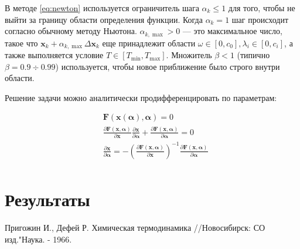﻿\documentclass[12pt]{article}
\newcommand{\pd}[2]{\frac{\partial #1}{\partial #2}}
\let\dividesymbol\div
\renewcommand{\div}{\operatorname{div}}
\renewcommand{\leq}{\leqslant}
\begin{document}
В методе \eqref{eq:newton} используется ограничитель шага $\alpha_k \leq 1$ для того, чтобы не выйти за границу области
определения функции. Когда $\alpha_k = 1$ шаг происходит согласно обычному методу Ньютона. $\alpha_{k, \max} > 0$ ---
это максимальное число, такое что $\mathbf{x}_k + \alpha_{k,\max} \Delta \mathbf{x}_{k}$ еще принадлежит области
$\omega \in [0,c_0], \lambda_i \in [0, c_i]$, а также выполняется условие $T \in [T_{\min}, T_{\max}]$. Множитель
$\beta < 1$ (типично $\beta = 0.9 \dividesymbol 0.99$) используется, чтобы новое приближение было строго внутри
области.

Решение задачи можно аналитически продифференцировать по параметрам:

\begin{equation}
\begin{aligned}
&\mathbf{F}(\mathbf{x}(\boldsymbol \alpha), \boldsymbol \alpha) = 0\\
&\pd{\mathbf{F}(\mathbf{x}, \boldsymbol \alpha)}{\mathbf{x}} \pd{\mathbf{x}}{\boldsymbol \alpha} +
\pd{\mathbf{F}(\mathbf{x}, \boldsymbol \alpha)}{\boldsymbol \alpha} = 0\\
&\pd{\mathbf{x}}{\boldsymbol \alpha} = -\left(\pd{\mathbf{F}(\mathbf{x}, \boldsymbol \alpha)}{\mathbf{x}}\right)^{-1}
\pd{\mathbf{F}(\mathbf{x}, \boldsymbol \alpha)}{\boldsymbol \alpha} \\
\end{aligned}
\end{equation}

\section{Результаты}

\newpage

\begin{thebibliography}{9}
     Пригожин И., Дефей Р. Химическая термодинамика //Новосибирск: СО изд."Наука. - 1966.
\end{thebibliography}
\end{document}
